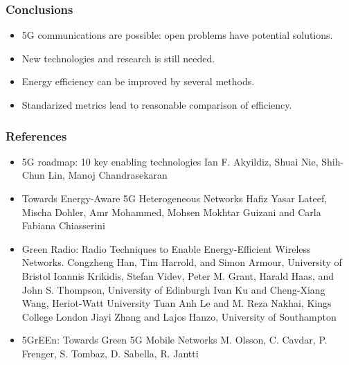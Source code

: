 \documentclass[a4paper,11pt,handout]{beamer}
\begin{document}
\begin{frame}
\frametitle{Conclusions}

\begin{itemize}
	\item 5G communications are possible: open problems have potential solutions.
	\item New technologies and research is still needed.
	\item Energy efficiency can be improved by several methods.
	\item Standarized metrics lead to reasonable comparison of efficiency.
\end{itemize}
\end{frame}
\begin{frame}
\frametitle{References}
\begin{itemize}
	\item 5G roadmap: 10 key enabling technologies Ian F. Akyildiz, Shuai Nie, 
Shih-Chun Lin, Manoj Chandrasekaran
\item Towards Energy-Aware 5G Heterogeneous Networks Hafiz Yasar Lateef, Mischa Dohler, Amr Mohammed, Mohsen Mokhtar Guizani and Carla Fabiana Chiasserini
\item Green Radio: Radio Techniques to Enable Energy-Efficient Wireless Networks. Congzheng Han, Tim Harrold, and Simon Armour, University of Bristol Ioannis Krikidis, Stefan Videv, Peter M. Grant, Harald Haas, and John S. Thompson, University of Edinburgh Ivan Ku and Cheng-Xiang Wang, Heriot-Watt University Tuan Anh Le and M. Reza Nakhai, Kings College London Jiayi Zhang and Lajos Hanzo, University of Southampton
\item 5GrEEn: Towards Green 5G Mobile Networks M. Olsson, C. Cavdar, P. Frenger, S. Tombaz, D. Sabella, R. Jantti
\end{itemize}
\end{frame}
\note{
}
\end{document}
